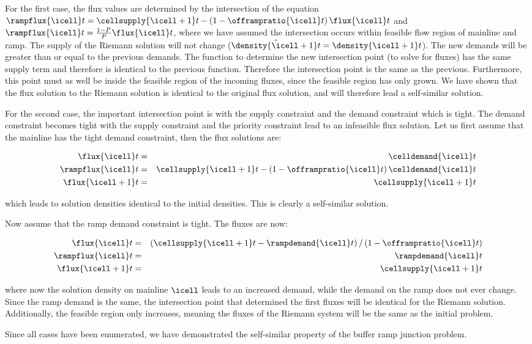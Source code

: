 For the first case, the flux values are determined by the intersection
of the equation $\rampflux{\icell}t=\cellsupply{\icell+1}t-\left(1-\offrampratio{\icell}t\right)\flux{\icell}t$
and $\rampflux{\icell}t=\frac{1-P}{P}\flux{\icell}t$, where we have
assumed the intersection occurs within feasible flow region of mainline
and ramp. The supply of the Riemann solution will not change ($\hat{\density{\icell+1}t}=\density{\icell+1}t$).
The new demands will be greater than or equal to the previous demands.
The function to determine the new intersection point (to solve for
fluxes) has the same supply term and therefore is identical to the
previous function. Therefore the intersection point is the same as
the previous. Furthermore, this point must as well be inside the feasible
region of the incoming fluxes, since the feasible region has only
grown. We have shown that the flux solution to the Riemann solution
is identical to the original flux solution, and will therefore lead
a self-similar solution.

For the second case, the important intersection point is with the
supply constraint and the demand constraint which is tight. The demand
constraint becomes tight with the supply constraint and the priority
constraint lead to an infeasible flux solution. Let us first assume
that the mainline has the tight demand constraint, then the flux solutions
are:

\begin{eqnarray*}
\flux{\icell}t & = & \celldemand{\icell}t\\
\rampflux{\icell}t & = & \cellsupply{\icell+1}t-\left(1-\offrampratio{\icell}t\right)\celldemand{\icell}t\\
\flux{\icell+1}t & = & \cellsupply{\icell+1}t
\end{eqnarray*}


which leads to solution densities identical to the initial densities.
This is clearly a self-similar solution.

Now assume that the ramp demand constraint is tight. The fluxes are
now:

\begin{eqnarray*}
\flux{\icell}t & = & \left(\cellsupply{\icell+1}t-\rampdemand{\icell}t\right)/\left(1-\offrampratio{\icell}t\right)\\
\rampflux{\icell}t & = & \rampdemand{\icell}t\\
\flux{\icell+1}t & = & \cellsupply{\icell+1}t
\end{eqnarray*}


where now the solution density on mainline $\icell$ leads to an increased
demand, while the demand on the ramp does not ever change. Since the
ramp demand is the same, the intersection point that determined the
first fluxes will be identical for the Riemann solution. Additionally,
the feasible region only increases, meaning the fluxes of the Riemann
system will be the same as the initial problem.

Since all cases have been enumerated, we have demonstrated the self-similar
property of the buffer ramp junction problem.

